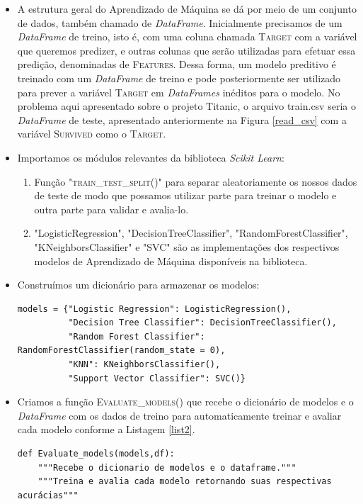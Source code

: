 \documentclass{article}
\begin{document}
\begin{itemize}
\item A estrutura geral do Aprendizado de Máquina se dá por meio de um conjunto de dados, também chamado de \emph{DataFrame}. Inicialmente precisamos de um \emph{DataFrame} de treino, isto é, com uma coluna chamada \textsc{Target} com a variável que queremos predizer, e outras colunas que serão utilizadas para efetuar essa predição, denominadas de \textsc{Features}. Dessa forma, um modelo preditivo é treinado com um \emph{DataFrame} de treino e pode posteriormente ser utilizado para prever a variável \textsc{Target} em \emph{DataFrames} inéditos para o modelo. No problema aqui apresentado sobre o projeto Titanic, o arquivo train.csv seria o \emph{DataFrame} de teste, apresentado anteriormente na Figura \ref{read_csv} com a variável \textsc{Survived} como o \textsc{Target}.
\item Importamos os módulos relevantes da biblioteca \emph{Scikit Learn}: 
\begin{enumerate}
\begin{verbatim}
from sklearn.model_selection import train_test_split
from sklearn.linear_model import LogisticRegression
from sklearn.tree import DecisionTreeClassifier
from sklearn.ensemble import RandomForestClassifier
from sklearn.neighbors import KNeighborsClassifier
from sklearn.svm import SVC
\end{verbatim}
Em relação a esses módulos, trouxemos uma breve explicação deles na sequência:
\item Função "\textsc{train\_test\_split()}" para separar aleatoriamente os nossos dados de teste de modo que possamos utilizar parte para treinar o modelo e outra parte para validar e avalia-lo. 
\item "LogisticRegression", "DecisionTreeClassifier", "RandomForestClassifier", "KNeighborsClassifier" e "SVC" são as implementações dos respectivos modelos de Aprendizado de Máquina disponíveis na biblioteca. 
\end{enumerate}
\item Construímos um dicionário para armazenar os modelos:
\begin{verbatim}
models = {"Logistic Regression": LogisticRegression(),          
          "Decision Tree Classifier": DecisionTreeClassifier(), 
          "Random Forest Classifier": RandomForestClassifier(random_state = 0),
          "KNN": KNeighborsClassifier(),
          "Support Vector Classifier": SVC()}
\end{verbatim}
\item Criamos a função \textsc{Evaluate\_models()} que recebe o dicionário de modelos e o \emph{DataFrame} com os dados de treino para  automaticamente treinar e avaliar cada modelo conforme a Listagem \ref{list2}.
\begin{listing}[!ht]
\begin{verbatim}
def Evaluate_models(models,df):
    """Recebe o dicionario de modelos e o dataframe."""
    """Treina e avalia cada modelo retornando suas respectivas acurácias"""
    

\end{verbatim}
\end{listing}
\end{itemize}
\end{document}
